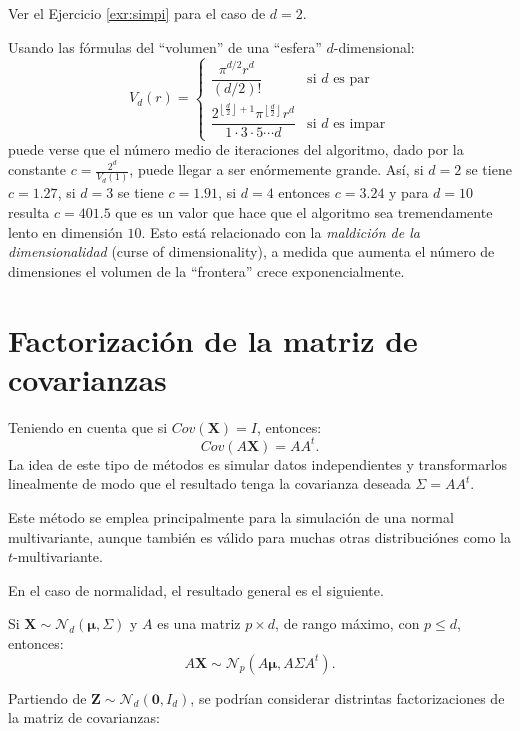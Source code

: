 \documentclass[
]{book}
\theoremstyle{break}
\theoremstyle{definition}
\theoremstyle{definition}
\theoremstyle{definition}
\theoremstyle{remark}
\let\BeginKnitrBlock\begin \let\EndKnitrBlock\end
\begin{document}
Ver el Ejercicio \ref{exr:simpi} para el caso de \(d=2\).

Usando las fórmulas del ``volumen'' de una ``esfera'' \(d\)-dimensional:
\[V_d\left( r\right)  =\left\{
\begin{array}{ll}
\dfrac{\pi^{d/2}r^{d}}{\left( d/2\right)  !} & \text{si } d \text{ es par}\\
\dfrac{2^{\left\lfloor \frac{d}{2}\right\rfloor +1}\pi^{\left\lfloor \frac{d}{2}\right\rfloor }r^{d}}{1\cdot3\cdot5\cdots d} & \text{si } d \text{ es impar}
\end{array}\right.\]
puede verse que el número medio de iteraciones del algoritmo, dado por la constante
\(c=\frac{2^{d}}{V_d\left(1 \right)}\), puede llegar a ser enórmemente grande.
Así, si \(d=2\) se tiene \(c=1.27\), si \(d=3\) se tiene \(c=1.91\), si \(d=4\) entonces \(c=3.24\) y para
\(d=10\) resulta \(c=401.5\) que es un valor que hace que el algoritmo sea
tremendamente lento en dimensión \(10\).
Esto está relacionado con la \emph{maldición de la dimensionalidad} (curse of dimensionality), a medida que aumenta el número de dimensiones el volumen de la ``frontera'' crece exponencialmente.

\hypertarget{fact-cov}{%
\section{Factorización de la matriz de covarianzas}\label{fact-cov}}

Teniendo en cuenta que si \(Cov(\mathbf{X})= I\), entonces:
\[Cov(A\mathbf{X}) = AA^t.\]
La idea de este tipo de métodos es simular datos independientes y transformarlos linealmente de modo que el resultado tenga la covarianza deseada \(\Sigma = AA^t\).

Este método se emplea principalmente para la simulación de una
normal multivariante, aunque también es válido para muchas otras
distribuciónes como la \(t\)-multivariante.

En el caso de normalidad, el resultado general es el siguiente.

\BeginKnitrBlock{proposition}
\protect\hypertarget{prp:unnamed-chunk-4}{}{\label{prp:unnamed-chunk-4} }
Si \(\mathbf{X} \sim \mathcal{N}_d\left( \boldsymbol\mu,\Sigma \right)\) y \(A\) es una matriz \(p\times d\), de
rango máximo, con \(p\leq d\), entonces:
\[A\mathbf{X} \sim \mathcal{N}_{p}\left(A\boldsymbol\mu,A\Sigma A^t\right).\]
\EndKnitrBlock{proposition}

Partiendo de \(\mathbf{Z} \sim \mathcal{N}_d\left( \mathbf{0},I_d\right)\),
se podrían considerar distrintas factorizaciones de la
matriz de covarianzas:
\end{document}
